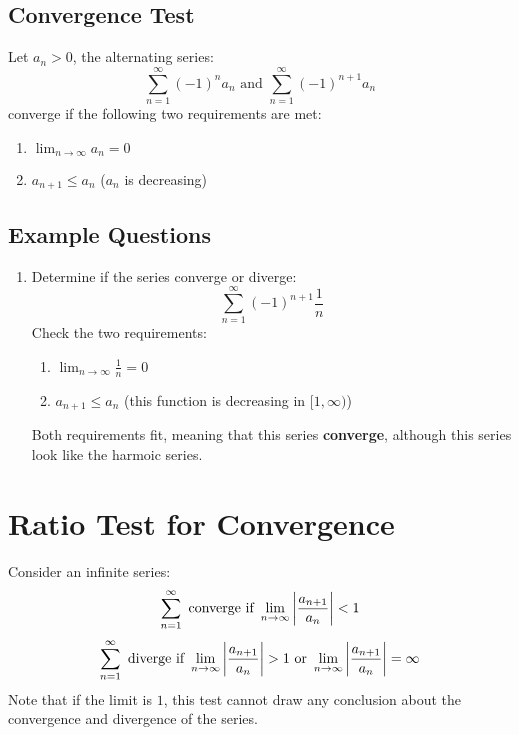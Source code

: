 \documentclass{article}
\numberwithin{equation}{section}
\begin{document}
\subsection{Convergence Test}
Let $a_n > 0$, the alternating series:
\[
    \sum_{n = 1}^{\infty} (-1)^n a_n \text{ and } \sum_{n = 1}^{\infty} (-1)^{n+1} a_n
\]
converge if the following two requirements are met:
\begin{enumerate}
    \item $\lim_{n\to \infty} a_n = 0$
    \item $a_{n+1} \leq a_n$ ($a_n$ is decreasing)
\end{enumerate}

\subsection{Example Questions}
\begin{enumerate}
    \item Determine if the series converge or diverge:
    \[
        \sum_{n = 1}^{\infty} (-1)^{n+1}\frac{1}{n}
    \]
    Check the two requirements:
    \begin{enumerate}
        \item $\lim_{n\to\infty} \frac{1}{n} = 0$
        \item $a_{n+1} \leq a_n$ (this function is decreasing in $[1,\infty)$)
    \end{enumerate}
    Both requirements fit, meaning that this series \textbf{converge}, although this series look like the harmoic series.
\end{enumerate}

\newpage
\section{Ratio Test for Convergence}
Consider an infinite series:
\begin{equation}
    \sum_{n = 1}^{\infty} \text{ converge if } \lim_{n\to \infty} \abs{\frac{a_{n+1}}{a_n}} < 1
\end{equation}
\begin{equation}
    \sum_{n = 1}^{\infty} \text{ diverge if } \lim_{n\to \infty} \abs{\frac{a_{n+1}}{a_n}} > 1 \text{ or } \lim_{n\to \infty} \abs{\frac{a_{n+1}}{a_n}} = \infty
\end{equation}
Note that if the limit is $1$, this test cannot draw any conclusion about the convergence and divergence of the series.
\end{document}
